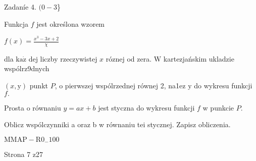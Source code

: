\documentclass[a4paper,12pt]{article}
\begin{document}
Zadaníe 4. $(0-3$\}

Funkcja $f$ jest określona wzorem

$f(x)=\displaystyle \frac{x^{3}-3x+2}{\chi}$

dla $\mathrm{k}\mathrm{a}\dot{\mathrm{z}}$ dej liczby rzeczywistej $x$ róznej od zera. $\mathrm{W}$ kartezjańskim ukladzie wspólrz9dnych

$(x,\mathrm{y})$ punkt $P$, o pierwszej wspólrzednej równej 2, na1ez $\mathrm{y}$ do wykresu funkcji $f.$

Prosta o równaniu $y=ax+b$ jest styczna do wykresu funkcji $f$ w punkcie $P.$

Oblicz wspólczynniki a oraz b w równaniu tei stycznej. Zapisz obliczenia.

$\mathrm{M}\mathrm{M}\mathrm{A}\mathrm{P}-\mathrm{R}0_{-}100$

Strona 7 z27
\end{document}
